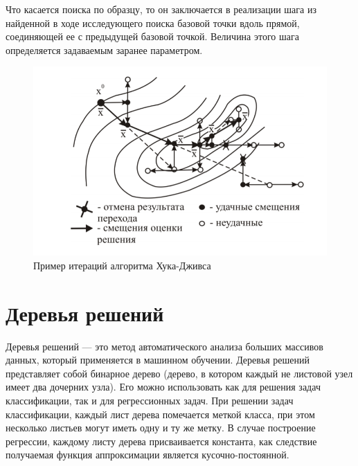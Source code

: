 \documentclass[12pt, a4paper, russian]{article}
\begin{document}
Что касается поиска по образцу, то он заключается в реализации шага из найденной в ходе исследующего поиска базовой точки вдоль прямой, соединяющей ее с предыдущей базовой точкой. Величина этого шага определяется задаваемым заранее параметром.

\begin{figure}[!h]
	\begin{center}
		\begin{minipage}[h]{0.8\linewidth}
			\includegraphics[width=1\linewidth]{figure/fig1.png}
			\caption{Пример итераций алгоритма Хука-Дживса} %
			\label{fig:fig1}
		\end{minipage}
	\end{center}
\end{figure}	

\section{Деревья решений}

Деревья решений --- это метод автоматического анализа больших массивов данных, который применяется в машинном обучении. Деревья решений представляет собой бинарное дерево (дерево, в котором каждый не листовой узел имеет два дочерних узла). Его можно использовать как для решения задач классификации, так и для регрессионных задач. При решении задач классификации, каждый лист дерева помечается меткой класса, при этом несколько листьев могут иметь одну и ту же метку. В случае построение регрессии, каждому листу дерева присваивается константа, как следствие  получаемая функция аппроксимации является кусочно-постоянной.
\end{document}
